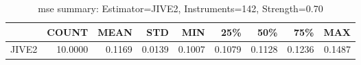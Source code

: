 \begin{table}[ht]
\centering
\caption{mse summary: Estimator=JIVE2, Instruments=142, Strength=0.70}
\begin{tabular}{lrrrrrrrr}
\toprule
 & COUNT & MEAN & STD & MIN & 25\% & 50\% & 75\% & MAX \\
\midrule
JIVE2 & 10.0000 & 0.1169 & 0.0139 & 0.1007 & 0.1079 & 0.1128 & 0.1236 & 0.1487 \\
\bottomrule
\end{tabular}
\end{table}
